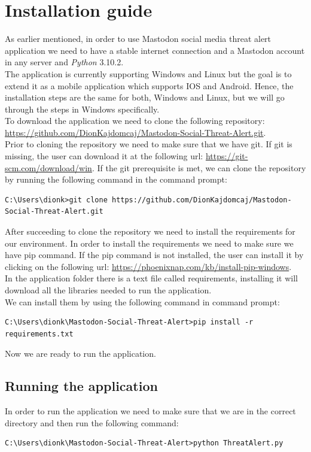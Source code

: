 \section{Installation guide}
\label{s:installation_guide}
As earlier mentioned, in order to use Mastodon social media threat alert application
we need to have a stable internet connection and a Mastodon account in any server and \textit{Python} 3.10.2.
\\[5pt]
The application is currently supporting Windows and Linux but the goal is to extend it as a 
mobile application which supports IOS and Android. Hence, the installation steps are the same for
both, Windows and Linux, but we will go through the steps in Windows specifically.
\\[5pt]
To download the application we need to clone the following repository: 
\url{https://github.com/DionKajdomcaj/Mastodon-Social-Threat-Alert.git}.
\\[5pt]
Prior to cloning the repository we need to make sure that we have git.
If git is missing, the user can download it at the
following url: \url{https://git-scm.com/download/win}.
If the git prerequisite is met, we can clone the repository by
running the following command in the command prompt:
\\[5pt]
\begin{lstlisting}[caption=Cloning Repository, captionpos=b]
	C:\Users\dionk>git clone https://github.com/DionKajdomcaj/Mastodon-Social-Threat-Alert.git
\end{lstlisting}
After succeeding to clone the repository we need to install the requirements for
our environment. In order to install the requirements we need to make sure we have
pip command. If the pip command is not installed, the user can install it by clicking
on the following url: \url{https://phoenixnap.com/kb/install-pip-windows}.
\\[5pt]
In the application folder there is a text file called requirements, installing it
will download all the libraries needed to run the application.
\\[5pt]
We can install them by using the following command in command prompt:
\\[5pt]
\begin{lstlisting}[caption=Installing requirements, captionpos=b]
	C:\Users\dionk\Mastodon-Social-Threat-Alert>pip install -r requirements.txt
\end{lstlisting}
Now we are ready to run the application.
\subsection{Running the application}
\label{ss:running_app}
In order to run the application we need to make sure that
we are in the correct directory and then run the following command:
\\[5pt]
\begin{lstlisting}[caption=Running the application, captionpos=b]
	C:\Users\dionk\Mastodon-Social-Threat-Alert>python ThreatAlert.py 
\end{lstlisting}

